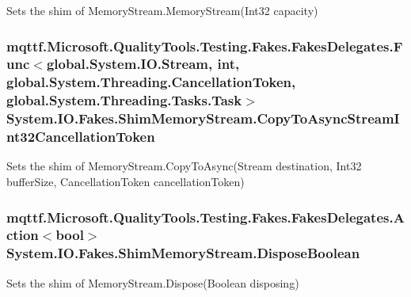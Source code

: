Sets the shim of Memory\-Stream.\-Memory\-Stream(\-Int32 capacity)

\hypertarget{class_system_1_1_i_o_1_1_fakes_1_1_shim_memory_stream_afd2e41ba42df56a4e2747ec0ea19edd2}{
\subsubsection[{Copy\-To\-Async\-Stream\-Int32\-Cancellation\-Token}]{\setlength{\rightskip}{0pt plus 5cm}mqttf.\-Microsoft.\-Quality\-Tools.\-Testing.\-Fakes.\-Fakes\-Delegates.\-Func$<$global.\-System.\-I\-O.\-Stream, int, global.\-System.\-Threading.\-Cancellation\-Token, global.\-System.\-Threading.\-Tasks.\-Task$>$ System.\-I\-O.\-Fakes.\-Shim\-Memory\-Stream.\-Copy\-To\-Async\-Stream\-Int32\-Cancellation\-Token\hspace{0.3cm}{\ttfamily [set]}}}\label{class_system_1_1_i_o_1_1_fakes_1_1_shim_memory_stream_afd2e41ba42df56a4e2747ec0ea19edd2}


Sets the shim of Memory\-Stream.\-Copy\-To\-Async(\-Stream destination, Int32 buffer\-Size, Cancellation\-Token cancellation\-Token)

\hypertarget{class_system_1_1_i_o_1_1_fakes_1_1_shim_memory_stream_ab2c9da88c1c5cb0ca93fac67727fd204}{
\subsubsection[{Dispose\-Boolean}]{\setlength{\rightskip}{0pt plus 5cm}mqttf.\-Microsoft.\-Quality\-Tools.\-Testing.\-Fakes.\-Fakes\-Delegates.\-Action$<$bool$>$ System.\-I\-O.\-Fakes.\-Shim\-Memory\-Stream.\-Dispose\-Boolean\hspace{0.3cm}{\ttfamily [set]}}}\label{class_system_1_1_i_o_1_1_fakes_1_1_shim_memory_stream_ab2c9da88c1c5cb0ca93fac67727fd204}


Sets the shim of Memory\-Stream.\-Dispose(\-Boolean disposing)

